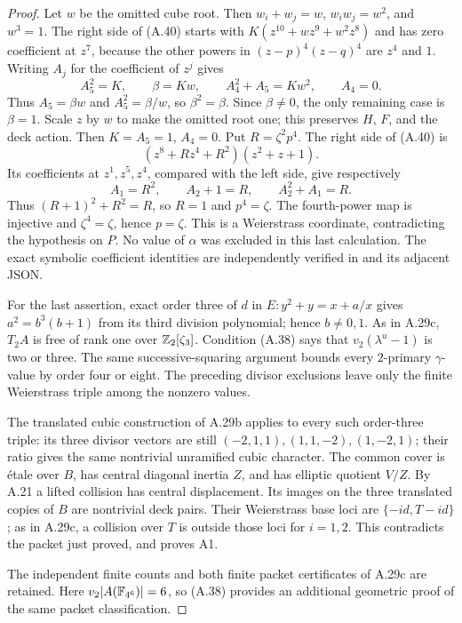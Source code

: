 \begin{proof}
Let $w$ be the omitted cube root. Then
$w_i+w_j=w$, $w_iw_j=w^2$, and $w^3=1$.
The right side of (A.40) starts with
$K(z^{10}+wz^9+w^2z^8)$ and has zero coefficient
at $z^7$, because the other powers in
$(z-p)^4(z-q)^4$ are $z^4$ and $1$.
Writing $A_j$ for the coefficient of $z^j$ gives
\[
 A_5^2=K,\qquad \beta=Kw,\qquad
 A_4^2+A_5=Kw^2,\qquad A_4=0.
\]
Thus $A_5=\beta w$ and $A_5^2=\beta/w$,
so $\beta^2=\beta$. Since $\beta\ne0$, the only
remaining case is $\beta=1$. Scale $z$ by $w$ to
make the omitted root one; this preserves $H$, $F$,
and the deck action. Then $K=A_5=1$, $A_4=0$.
Put $R=\zeta^2p^4$. The right side of (A.40) is
\[
 (z^8+Rz^4+R^2)(z^2+z+1).
\]
Its coefficients at $z^1,z^5,z^4$, compared with
the left side, give respectively
\[
 A_1=R^2,\qquad A_2+1=R,\qquad A_2^2+A_1=R.
\]
Thus $(R+1)^2+R^2=R$, so $R=1$ and $p^4=\zeta$.
The fourth-power map is injective and $\zeta^4=\zeta$,
hence $p=\zeta$. This is a Weierstrass coordinate,
contradicting the hypothesis on $P$. No value of
$\alpha$ was excluded in this last calculation.
The exact symbolic coefficient
identities are independently verified in
and its adjacent JSON.

For the last assertion, exact order three of $d$
in $E:y^2+y=x+a/x$ gives
$a^2=b^3(b+1)$ from its third division polynomial;
hence $b\ne0,1$. As in A.29c, $T_2A$ is free of
rank one over $\mathbb Z_2[\zeta_3]$. Condition (A.38)
says that $v_2(\lambda^u-1)$ is two or three.
The same successive-squaring argument bounds every
$2$-primary $\gamma$-value by order four or eight.
The preceding divisor exclusions leave only the
finite Weierstrass triple among the nonzero values.

The translated cubic construction of A.29b applies
to every such order-three triple: its three divisor
vectors are still $(-2,1,1),(1,1,-2),(1,-2,1)$;
their ratio gives the same nontrivial unramified
cubic character. The common cover is \'etale over
$B$, has central diagonal inertia $Z$, and has
elliptic quotient $V/Z$. By A.21 a lifted collision
has central displacement. Its images on the three
translated copies of $B$ are nontrivial deck pairs.
Their Weierstrass base loci are $\{-id,T-id\}$;
as in A.29c, a collision over $T$ is outside those
loci for $i=1,2$. This contradicts the packet just
proved, and proves A1.

The independent finite counts and both finite
packet certificates of A.29c are retained. Here
$v_2|A(\mathbb F_{4^6})|=6$, so (A.38)
provides an additional geometric proof of the
same packet classification.
\end{proof}

